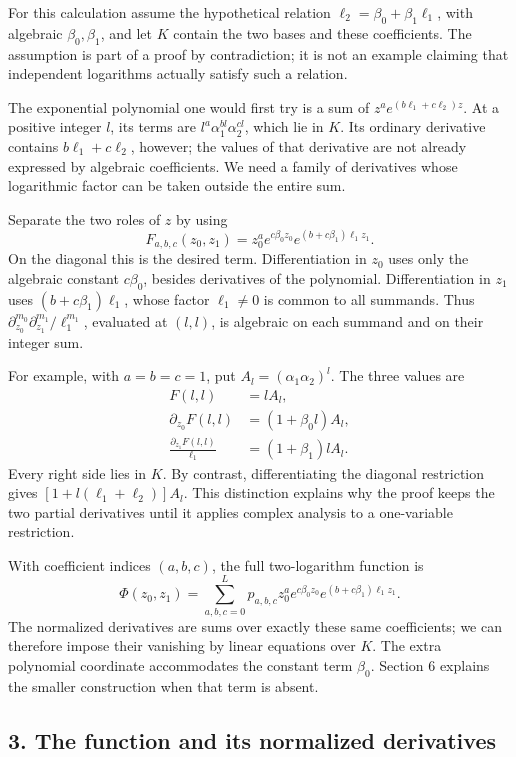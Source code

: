 \documentclass[
  11pt,
  a4paper,
]{article}
\begin{document}
For this calculation assume the hypothetical relation
\(\ell_2=\beta_0+\beta_1\ell_1\), with algebraic \(\beta_0,\beta_1\),
and let \(K\) contain the two bases and these coefficients. The
assumption is part of a proof by contradiction; it is not an example
claiming that independent logarithms actually satisfy such a relation.

The exponential polynomial one would first try is a sum of
\(z^a e^{(b\ell_1+c\ell_2)z}\). At a positive integer \(l\), its terms
are \(l^a\alpha_1^{bl}\alpha_2^{cl}\), which lie in \(K\). Its ordinary
derivative contains \(b\ell_1+c\ell_2\), however; the values of that
derivative are not already expressed by algebraic coefficients. We need
a family of derivatives whose logarithmic factor can be taken outside
the entire sum.

Separate the two roles of \(z\) by using \[
F_{a,b,c}(z_0,z_1)=z_0^a e^{c\beta_0z_0}
e^{(b+c\beta_1)\ell_1z_1}.
\] On the diagonal this is the desired term. Differentiation in \(z_0\)
uses only the algebraic constant \(c\beta_0\), besides derivatives of
the polynomial. Differentiation in \(z_1\) uses \((b+c\beta_1)\ell_1\),
whose factor \(\ell_1\ne0\) is common to all summands. Thus
\(\partial_{z_0}^{m_0}\partial_{z_1}^{m_1}/\ell_1^{m_1}\), evaluated at
\((l,l)\), is algebraic on each summand and on their integer sum.

For example, with \(a=b=c=1\), put \(A_l=(\alpha_1\alpha_2)^l\). The
three values are \[
\begin{aligned}
F(l,l)&=lA_l,\\
\partial_{z_0}F(l,l)&=(1+\beta_0l)A_l,\\
\frac{\partial_{z_1}F(l,l)}{\ell_1}&=(1+\beta_1)lA_l.
\end{aligned}
\] Every right side lies in \(K\). By contrast, differentiating the
diagonal restriction gives \([1+l(\ell_1+\ell_2)]A_l\). This distinction
explains why the proof keeps the two partial derivatives until it
applies complex analysis to a one-variable restriction.

With coefficient indices \((a,b,c)\), the full two-logarithm function is
\[
\Phi(z_0,z_1)=\sum_{a,b,c=0}^L
p_{a,b,c}z_0^a e^{c\beta_0z_0}
e^{(b+c\beta_1)\ell_1z_1}.
\] The normalized derivatives are sums over exactly these same
coefficients; we can therefore impose their vanishing by linear
equations over \(K\). The extra polynomial coordinate accommodates the
constant term \(\beta_0\). Section 6 explains the smaller construction
when that term is absent.

\subsection{3. The function and its normalized
derivatives}\label{the-function-and-its-normalized-derivatives}
\end{document}
